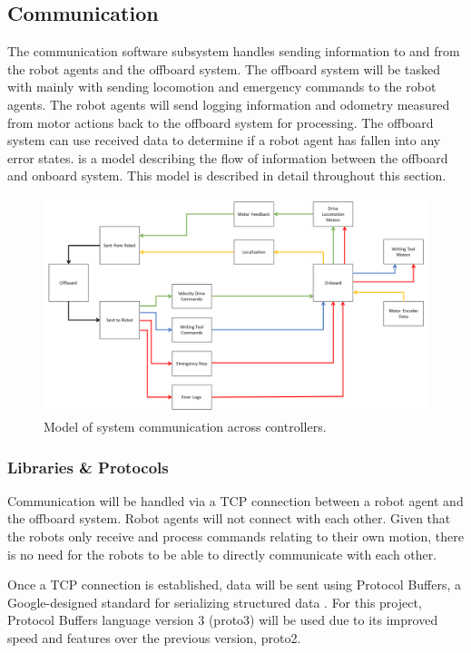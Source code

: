 
\subsection{Communication}
\label{sec:software_comm}

The communication software subsystem handles sending information to and from the robot agents and the offboard system. The offboard system will be tasked with mainly with sending locomotion and emergency commands to the robot agents. The robot agents will send logging information and odometry measured from motor actions back to the offboard system for processing. The offboard system can use received data to determine if a robot agent has fallen into any error states.  is a model describing the flow of information between the offboard and onboard system. This model is described in detail throughout this section.

\begin{figure}
\centering
\includegraphics[width=0.9\columnwidth]{figs/sw_arch_communication.png}
\caption{Model of system communication across controllers.}
\label{fig:software_comm_model}
\end{figure}

\subsubsection{Libraries \& Protocols}
\label{sec:software_comm_libs}
Communication will be handled via a TCP connection between a robot agent and the offboard system. Robot agents will not connect with each other. Given that the robots only receive and process commands relating to their own motion, there is no need for the robots to be able to directly communicate with each other.

Once a TCP connection is established, data will be sent using Protocol Buffers, a Google-designed standard for serializing structured data \cite{protobuf3}. For this project, Protocol Buffers language version 3 (proto3) will be used due to its improved speed and features over the previous version, proto2.

